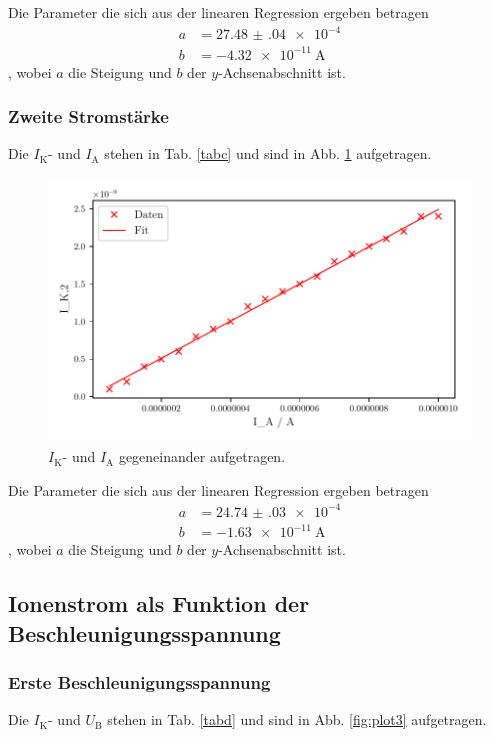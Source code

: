 Die Parameter die sich aus der linearen Regression ergeben betragen
\begin{align*}
    a &= \num{27.48(04)e-4}\\
    b &= \SI{-4.32e-11}{\ampere} 
\end{align*}, wobei $a$ die Steigung und $b$ der $y$-Achsenabschnitt ist. 

\subsubsection{Zweite Stromstärke}
Die $I_\text{K}$- und $I_\text{A}$ stehen in Tab. \ref{tabc} und sind in Abb. \ref{fig:plot2} aufgetragen. 

\begin{figure}
    \centering
    \includegraphics[width=12cm, height=7cm]{build/plot2.pdf}
    \caption{$I_\text{K}$- und $I_\text{A}$ gegeneinander aufgetragen.
    }
    \label{fig:plot2}
\end{figure}


Die Parameter die sich aus der linearen Regression ergeben betragen
\begin{align*}
    a &= \num{24.74(03)e-4}\\
    b &= \SI{-1.63e-11}{\ampere} 
\end{align*}, wobei $a$ die Steigung und $b$ der $y$-Achsenabschnitt ist. 


\subsection{Ionenstrom als Funktion der Beschleunigungsspannung}

\subsubsection{Erste Beschleunigungsspannung}
Die $I_\text{K}$- und $U_\text{B}$ stehen in Tab. \ref{tabd} und sind in Abb. \ref{fig:plot3} aufgetragen. 

